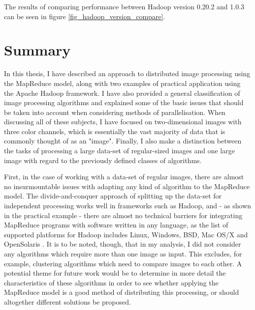 \documentclass [12pt,a4paper]{report}
\begin{document}
The results of comparing performance between Hadoop version 0.20.2 and 1.0.3 can be seen in figure \ref{fig_hadoop_version_compare}.



\chapter{Summary}

In this thesis, I have described an approach to distributed image processing using the MapReduce model, along with two examples of practical application using the Apache Hadoop framework. I have also provided a general classification of image processing algorithms and explained some of the basic issues that should be taken into account when considering methods of parallelisation. When discussing all of these subjects, I have focused on two-dimensional images with three color channels, which is essentially the vast majority of data that is commonly thought of as an "image". Finally, I also make a distinction between the tasks of processing a large data-set of regular-sized images and one large image with regard to the previously defined classes of algorithms.
 
First, in the case of working with a data-set of regular images, there are almost no insurmountable issues with adapting any kind of algorithm to the MapReduce model. The divide-and-conquer approach of splitting up the data-set for independent processing works well in frameworks such as Hadoop, and - as shown in the practical example - there are almost no technical barriers for integrating MapReduce programs with software written in any language, as the list of supported platforms for Hadoop includes Linux, Windows, BSD, Mac OS/X and OpenSolaris \cite{hadoopfaq}. It is to be noted, though, that in my analysis, I did not consider any algorithms which require more than one image as input. This excludes, for example, clustering algorithms which need to compare images to each other. A potential theme for future work would be to determine in more detail the characteristics of these algorithms in order to see whether applying the MapReduce model is a good method of distributing this processing, or should altogether different solutions be proposed.
\end{document}
